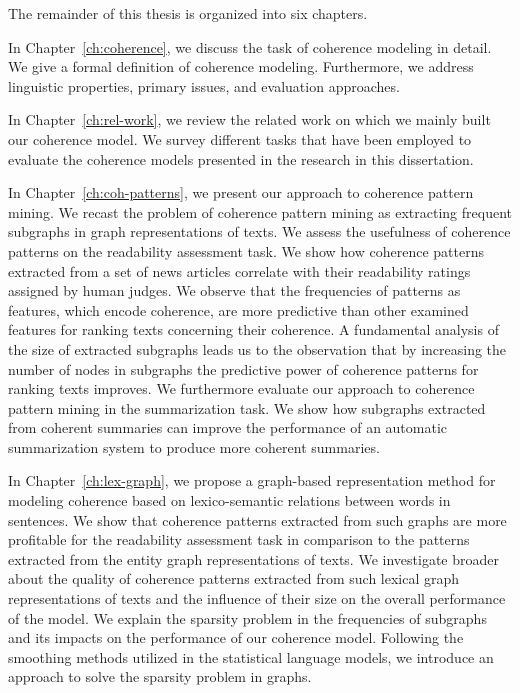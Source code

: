 The remainder of this thesis is organized into six chapters. 

In Chapter~\ref{ch:coherence}, we discuss the task of coherence modeling in detail.  
We give a formal definition of coherence modeling. 
Furthermore, we address linguistic properties, primary issues, and evaluation approaches. 

In Chapter~\ref{ch:rel-work}, we review the related work on which we mainly built our coherence model. 
We survey different tasks that have been employed to evaluate the coherence models presented in the research in this dissertation. 

In Chapter~\ref{ch:coh-patterns}, we present our approach to coherence pattern mining. 
We recast the problem of coherence pattern mining as extracting frequent subgraphs in graph representations of texts. 
We assess the usefulness of coherence patterns on the readability assessment task. 
We show how coherence patterns extracted from a set of news articles correlate with their readability ratings assigned by human judges. 
We observe that the frequencies of patterns as features, which encode coherence, are more predictive than other examined features for ranking texts concerning their coherence. 
A fundamental analysis of the size of extracted subgraphs leads us to the observation that by increasing the number of nodes in subgraphs the predictive power of coherence patterns for ranking texts improves. 
We furthermore evaluate our approach to coherence pattern mining in the summarization task.  
We show how subgraphs extracted from coherent summaries can improve the performance of an automatic summarization system to produce more coherent summaries. 

In Chapter~\ref{ch:lex-graph}, we propose a graph-based representation method for modeling coherence based on lexico-semantic relations between words in sentences.  
We show that coherence patterns extracted from such graphs are more profitable for the readability assessment task in comparison to the patterns extracted from the entity graph representations of texts. 
We investigate broader about the quality of coherence patterns extracted from such lexical graph representations of texts and the influence of their size on the overall performance of the model.   
We explain the sparsity problem in the frequencies of subgraphs and its impacts on the performance of our coherence model. 
Following the smoothing methods utilized in the statistical language models, we introduce an approach to solve the sparsity problem in graphs.  

